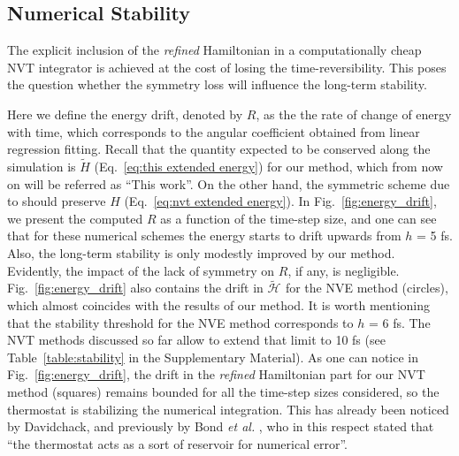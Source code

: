 \documentclass[
journal=jctcce,
layout=twocolumn
]{achemso}
\newcommand{\Ham}[1]{{\mathcal H}_\text{#1}}    %
\newcommand{\refined}[1]{\widetilde{#1}}
\begin{document}
 \subsection*{Numerical Stability}

The explicit inclusion of the \textit{refined} Hamiltonian in a computationally cheap NVT integrator is achieved at the cost of losing the time-reversibility.
This poses the question whether the symmetry loss will influence the long-term stability.

Here we define the energy drift, denoted by $R$, as the the rate of change of energy with time, which corresponds to the angular coefficient obtained from linear regression fitting.
Recall that the quantity expected to be conserved along the simulation is $\widetilde{H}$ (Eq.~\ref{eq:this extended energy}) for our method, which from now on will be referred as ``This work''.
On the other hand, the symmetric scheme due to \citeauthor{Martyna_1996} \cite{Martyna_1996} should preserve $H$ (Eq.~\ref{eq:nvt extended energy}).
In Fig.~\ref{fig:energy_drift}, we present the computed $R$ as a function of the time-step size, and one can see that for these numerical schemes the energy starts to drift upwards from $h$ = 5 fs. 
Also, the long-term stability is only modestly improved by our method. Evidently, the impact of the lack of symmetry on $R$, if any, is negligible.
Fig.~\ref{fig:energy_drift} also contains the drift in $\refined{\Ham{}}$ for the NVE method \cite{Silveira_2017} (circles), which almost coincides with the results of our method. It is worth mentioning that the stability threshold for the NVE method corresponds to $h$ = 6 fs.
The NVT methods discussed so far allow to extend that limit to 10 fs (see Table~\ref{table:stability} in the Supplementary Material). As one can notice in Fig.~\ref{fig:energy_drift}, the drift in the \textit{refined} Hamiltonian part for our NVT method (squares) remains bounded for all the time-step sizes considered, so the thermostat is stabilizing the numerical integration.
This has already been noticed by Davidchack\cite{Davidchack_2009}, and previously by Bond \textit{et al.} \cite{Bond_2007}, who in this respect stated that ``the thermostat acts as a sort of reservoir for numerical error''.
\end{document}
